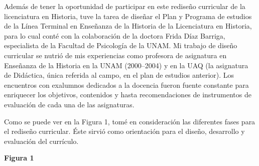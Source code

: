 Además de tener la oportunidad de participar en este rediseño 
curricular de la licenciatura en Historia, tuve la tarea de diseñar el 
Plan y Programa de estudios de la Línea Terminal en Enseñanza de la 
Historia de la Licenciatura en Historia, para lo cual conté con la 
colaboración de la doctora Frida Díaz Barriga, especialista de la 
Facultad de Psicología de la UNAM\@. Mi trabajo de diseño curricular 
se nutrió de  mis experiencias como profesora de asignatura en 
Enseñanza de la Historia en la UNAM (2000--2004) y en la UAQ (la 
asignatura de Didáctica, única referida al campo, en el plan de 
estudios anterior). Los encuentros con exalumnos dedicados a la 
docencia fueron fuente constante para enriquecer los objetivos,  
contenidos y hasta recomendaciones de instrumentos de evaluación de 
cada una de las asignaturas. 

Como se puede ver en la Figura 1, tomé en consideración las diferentes 
fases para el rediseño curricular. Éste sirvió como orientación para
el diseño, desarrollo y evaluación del currículo. 
\newpage

\textbf{Figura 1}

\begin{figure}
\end{figure}

